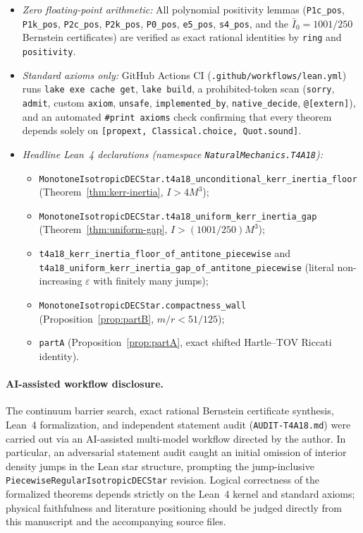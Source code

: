 \documentclass[11pt]{article}
\theoremstyle{plain}
\theoremstyle{definition}
\newcommand{\eps}{\varepsilon}
\newcommand{\Ibar}{\bar{I}}
\begin{document}
\begin{itemize}
  \item \emph{Zero floating-point arithmetic:} All polynomial positivity lemmas (\texttt{P1c\_pos}, \texttt{P1k\_pos}, \texttt{P2c\_pos}, \texttt{P2k\_pos}, \texttt{P0\_pos}, \texttt{e5\_pos}, \texttt{s4\_pos}, and the $\Ibar_0 = 1001/250$ Bernstein certificates) are verified as exact rational identities by \texttt{ring} and \texttt{positivity}.
  \item \emph{Standard axioms only:} GitHub Actions CI (\texttt{.github/workflows/lean.yml}) runs \texttt{lake exe cache get}, \texttt{lake build}, a prohibited-token scan (\texttt{sorry}, \texttt{admit}, custom \texttt{axiom}, \texttt{unsafe}, \texttt{implemented\_by}, \texttt{native\_decide}, \texttt{@[extern]}), and an automated \texttt{\#print axioms} check confirming that every theorem depends solely on \texttt{[propext, Classical.choice, Quot.sound]}.
  \item \emph{Headline Lean~4 declarations (namespace \texttt{NaturalMechanics.T4A18}):}
    \begin{itemize}
      \item \texttt{MonotoneIsotropicDECStar.t4a18\_unconditional\_kerr\_inertia\_floor} (Theorem~\ref{thm:kerr-inertia}, $I > 4 M^3$);
      \item \texttt{MonotoneIsotropicDECStar.t4a18\_uniform\_kerr\_inertia\_gap} (Theorem~\ref{thm:uniform-gap}, $I > (1001/250) M^3$);
      \item \texttt{t4a18\_kerr\_inertia\_floor\_of\_antitone\_piecewise} and \texttt{t4a18\_uniform\_kerr\_inertia\_gap\_of\_antitone\_piecewise} (literal non-increasing $\eps$ with finitely many jumps);
      \item \texttt{MonotoneIsotropicDECStar.compactness\_wall} (Proposition~\ref{prop:partB}, $m/r < 51/125$);
      \item \texttt{partA} (Proposition~\ref{prop:partA}, exact shifted Hartle--TOV Riccati identity).
    \end{itemize}
\end{itemize}

\paragraph{AI-assisted workflow disclosure.}
The continuum barrier search, exact rational Bernstein certificate synthesis, Lean~4 formalization, and independent statement audit (\texttt{AUDIT-T4A18.md}) were carried out via an AI-assisted multi-model workflow directed by the author. In particular, an adversarial statement audit caught an initial omission of interior density jumps in the Lean star structure, prompting the jump-inclusive \texttt{PiecewiseRegularIsotropicDECStar} revision. Logical correctness of the formalized theorems depends strictly on the Lean~4 kernel and standard axioms; physical faithfulness and literature positioning should be judged directly from this manuscript and the accompanying source files.
\end{document}
